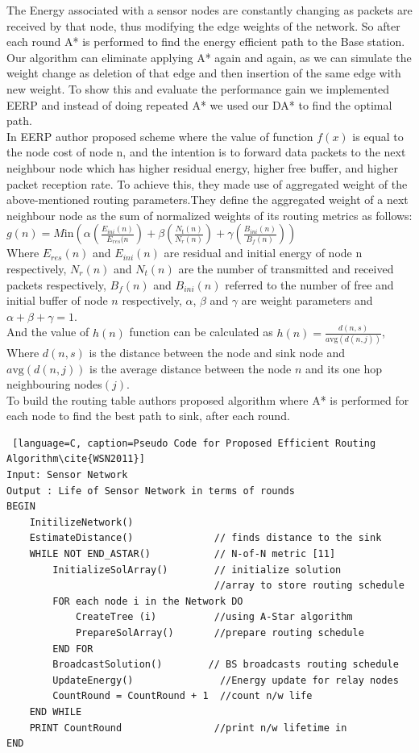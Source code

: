 \documentclass[a4paper]{article}
\begin{document}
The Energy associated with a sensor nodes are constantly changing as packets are received by that node, thus modifying the edge weights of the network. So after each round A* is performed to find the energy efficient path to the Base station. Our algorithm can eliminate applying A* again and again, as we can simulate the weight change as deletion of that edge and then insertion of the same edge with new weight. To show this and evaluate the performance gain we implemented EERP \cite{WSN2014} and instead of doing repeated A* we used our DA* to find the optimal path.\\
In EERP \cite{WSN2014} author proposed scheme where the value of
function $f(x)$ is equal to the node cost of node n, and the intention is to forward data packets to the next neighbour node which has higher residual energy, higher free buffer, and higher packet reception rate. To achieve this, they made use of aggregated weight of the above-mentioned routing parameters.They define the aggregated weight of a next neighbour node as the sum of normalized weights of its routing metrics as follows:\\
$g(n) = M\text{in}(\alpha(\frac{E_{ini}(n)}{E_{res}(n}) + \beta(\frac{N_t(n)}{N_r(n)}) + \gamma(\frac{B_{ini}(n)}{B_f(n)}) )$\\
Where $E_{res}(n)$ and $E_{ini}(n)$ are residual and initial energy of node n respectively, $N_r(n)$ and $N_t(n)$  are the number of transmitted and received packets respectively, $B_f(n)$ and $B_{ini}(n)$ referred to the number of free and initial buffer of node $n$ respectively, $\alpha$, $\beta$ and $\gamma$ are weight parameters and $\alpha + \beta + \gamma = 1$.\\
And the value of $h(n)$ function can be calculated as $h(n) = \frac{d(n,s)}{a\text{vg}(d(n,j))}$, Where $d(n,s)$ is the distance between the node and sink node and $a\text{vg}(d(n,j))$ is the average distance between the node $n$ and its one hop neighbouring nodes$(j)$.\\
To build the routing table authors\cite{WSN2011} proposed algorithm where A* is performed for each node to find the best path to sink, after each round.
\begin{lstlisting} [language=C, caption=Pseudo Code for Proposed Efficient Routing Algorithm\cite{WSN2011}]
Input: Sensor Network
Output : Life of Sensor Network in terms of rounds
BEGIN
    InitilizeNetwork()
    EstimateDistance()              // finds distance to the sink
    WHILE NOT END_ASTAR()           // N-of-N metric [11]
        InitializeSolArray()        // initialize solution
                                    //array to store routing schedule
        FOR each node i in the Network DO
            CreateTree (i)          //using A-Star algorithm
            PrepareSolArray()       //prepare routing schedule
        END FOR
        BroadcastSolution()        // BS broadcasts routing schedule
        UpdateEnergy()               //Energy update for relay nodes
        CountRound = CountRound + 1  //count n/w life
    END WHILE
    PRINT CountRound                //print n/w lifetime in
END
\end{lstlisting}
\end{document}
